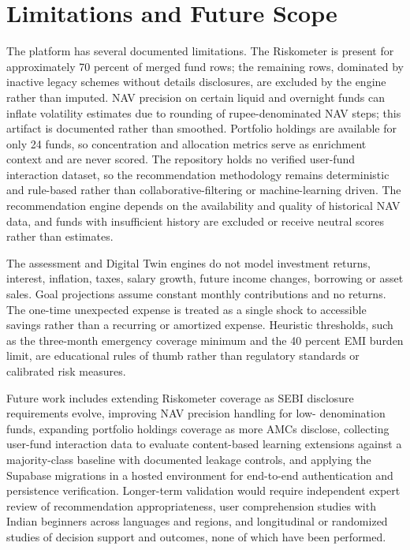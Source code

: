 \section{Limitations and Future Scope}

The platform has several documented limitations. The Riskometer is present for approximately 70 percent of merged fund rows; the remaining rows, dominated by inactive legacy schemes without details disclosures, are excluded by the engine rather than imputed. NAV precision on certain liquid and overnight funds can inflate volatility estimates due to rounding of rupee-denominated NAV steps; this artifact is documented rather than smoothed. Portfolio holdings are available for only 24 funds, so concentration and allocation metrics serve as enrichment context and are never scored. The repository holds no verified user-fund interaction dataset, so the recommendation methodology remains deterministic and rule-based rather than collaborative-filtering or machine-learning driven. The recommendation engine depends on the availability and quality of historical NAV data, and funds with insufficient history are excluded or receive neutral scores rather than estimates.

The assessment and Digital Twin engines do not model investment returns, interest, inflation, taxes, salary growth, future income changes, borrowing or asset sales. Goal projections assume constant monthly contributions and no returns. The one-time unexpected expense is treated as a single shock to accessible savings rather than a recurring or amortized expense. Heuristic thresholds, such as the three-month emergency coverage minimum and the 40 percent EMI burden limit, are educational rules of thumb rather than regulatory standards or calibrated risk measures.

Future work includes extending Riskometer coverage as SEBI disclosure requirements evolve, improving NAV precision handling for low- denomination funds, expanding portfolio holdings coverage as more AMCs disclose, collecting user-fund interaction data to evaluate content-based learning extensions against a majority-class baseline with documented leakage controls, and applying the Supabase migrations in a hosted environment for end-to-end authentication and persistence verification. Longer-term validation would require independent expert review of recommendation appropriateness, user comprehension studies with Indian beginners across languages and regions, and longitudinal or randomized studies of decision support and outcomes, none of which have been performed.